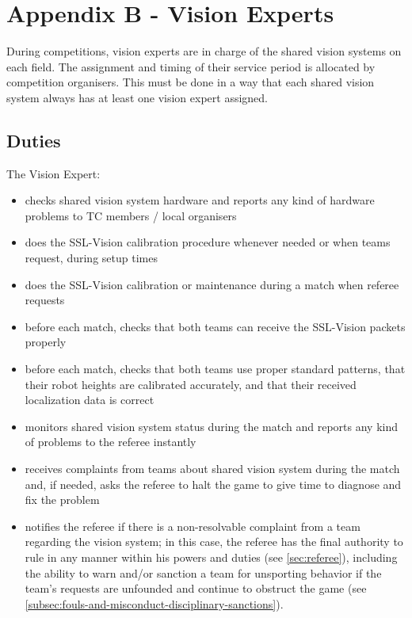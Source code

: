 \section{Appendix B - Vision Experts}\label{app:vision-experts}

During competitions, vision experts are in charge of the shared vision systems on each field.
The assignment and timing of their service period is allocated by competition organisers.
This must be done in a way that each shared vision system always has at least one vision expert assigned.

\subsection{Duties}
The Vision Expert:
\begin{itemize}
\item checks shared vision system hardware and reports any kind of hardware problems to TC members / local organisers
\item does the SSL-Vision calibration procedure whenever needed or when teams request, during setup times
\item does the SSL-Vision calibration or maintenance during a match when referee requests
\item before each match, checks that both teams can receive the SSL-Vision packets properly
\item before each match, checks that both teams use proper standard patterns, that their robot heights are calibrated accurately, and that their received localization data is correct
\item monitors shared vision system status during the match and reports any kind of problems to the referee instantly
\item receives complaints from teams about shared vision system during the match and, if needed, asks the referee to halt the game to give time to diagnose and fix the problem
\item notifies the referee if there is a non-resolvable complaint from a team regarding the vision system; in this case, the referee has the final authority to rule in any manner within his powers and duties (see \autoref{sec:referee}), including the ability to warn and/or sanction a team for unsporting behavior if the team's requests are unfounded and continue to obstruct the game (see \autoref{subsec:fouls-and-misconduct-disciplinary-sanctions}).
\end{itemize}
